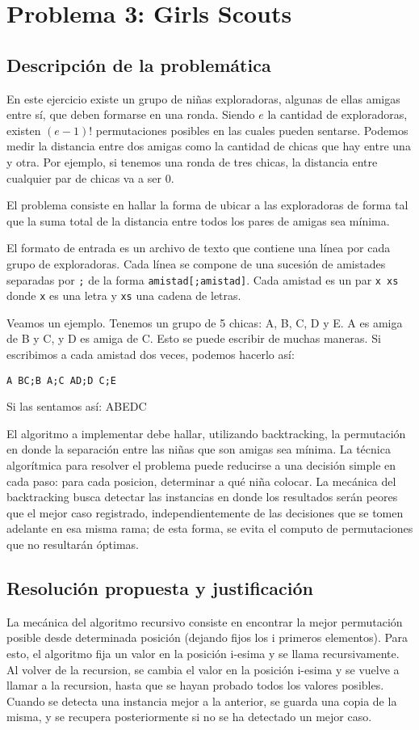 \section{Problema 3: Girls Scouts}
\subsection{Descripción de la problemática}

En este ejercicio existe un grupo de niñas exploradoras, algunas de ellas amigas entre sí, que deben formarse en una ronda. Siendo $e$ la cantidad de exploradoras, existen $(e-1)!$ permutaciones posibles en las cuales pueden sentarse. Podemos medir la distancia entre dos amigas como la cantidad de chicas que hay entre una y otra. Por ejemplo, si tenemos una ronda de tres chicas, la distancia entre cualquier par de chicas va a ser 0.

El problema consiste en hallar la forma de ubicar a las exploradoras de forma tal que la suma total de la distancia entre todos los pares de amigas sea mínima.

El formato de entrada es un archivo de texto que contiene una línea por cada grupo de exploradoras. Cada línea se compone de una sucesión de amistades separadas por \texttt{;} de la forma \texttt{amistad[;amistad]}. Cada amistad es un par \texttt{x xs} donde \texttt{x} es una letra y \texttt{xs} una cadena de letras.

Veamos un ejemplo. Tenemos un grupo de 5 chicas: A, B, C, D y E. A es amiga de B y C, y D es amiga de C. Esto se puede escribir de muchas maneras. Si escribimos a cada amistad dos veces, podemos hacerlo así:

\texttt{A BC;B A;C AD;D C;E}

Si las sentamos así:  ABEDC


El algoritmo a implementar debe hallar, utilizando backtracking, la permutación en donde la separación entre las niñas que son amigas sea mínima. La técnica algorítmica para resolver el problema puede reducirse a una decisión simple en cada paso: para cada posicion, determinar a qué niña colocar. La mecánica del backtracking busca detectar las instancias en donde los resultados serán peores que el mejor caso registrado, independientemente de las decisiones que se tomen adelante en esa misma rama; de esta forma, se evita el computo de permutaciones que no resultarán óptimas.


\subsection{Resoluci\'on propuesta y justificaci\'on}
La mecánica del algoritmo recursivo consiste en encontrar la mejor permutación posible desde determinada posición (dejando fijos los i primeros elementos).
Para esto, el algoritmo fija un valor en la posición i-esima y se llama recursivamente. Al volver de la recursion, se cambia el valor en la posición i-esima y se vuelve a llamar a la recursion, hasta que se hayan probado todos los valores posibles.
Cuando se detecta una instancia mejor a la anterior, se guarda una copia de la misma, y se recupera posteriormente si no se ha detectado un mejor caso.
